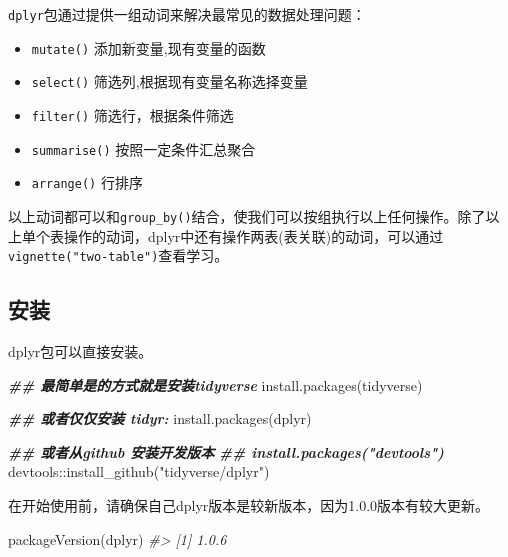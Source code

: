 \documentclass[
]{book}
\newenvironment{Shaded}{\begin{snugshade}}{\end{snugshade}}
\newcommand{\CommentTok}[1]{\textcolor[rgb]{0.56,0.35,0.01}{\textit{#1}}}
\newcommand{\DocumentationTok}[1]{\textcolor[rgb]{0.56,0.35,0.01}{\textbf{\textit{#1}}}}
\newcommand{\FunctionTok}[1]{\textcolor[rgb]{0.00,0.00,0.00}{#1}}
\newcommand{\NormalTok}[1]{#1}
\newcommand{\SpecialCharTok}[1]{\textcolor[rgb]{0.00,0.00,0.00}{#1}}
\newcommand{\StringTok}[1]{\textcolor[rgb]{0.31,0.60,0.02}{#1}}
\begin{document}
\texttt{dplyr}包通过提供一组动词来解决最常见的数据处理问题：

\begin{itemize}
\item
  \texttt{mutate()} 添加新变量,现有变量的函数
\item
  \texttt{select()} 筛选列,根据现有变量名称选择变量
\item
  \texttt{filter()} 筛选行，根据条件筛选
\item
  \texttt{summarise()} 按照一定条件汇总聚合
\item
  \texttt{arrange()} 行排序
\end{itemize}

以上动词都可以和\texttt{group\_by()}结合，使我们可以按组执行以上任何操作。除了以上单个表操作的动词，dplyr中还有操作两表(表关联)的动词，可以通过\texttt{vignette("two-table")}查看学习。

\hypertarget{dplyr:install-package}{%
\subsection{安装}\label{dplyr:install-package}}

dplyr包可以直接安装。

\begin{Shaded}
\begin{Highlighting}[]
\DocumentationTok{\#\# 最简单是的方式就是安装tidyverse}
\FunctionTok{install.packages}\NormalTok{(}\StringTok{\textquotesingle{}tidyverse\textquotesingle{}}\NormalTok{)}

\DocumentationTok{\#\# 或者仅仅安装 tidyr:}
\FunctionTok{install.packages}\NormalTok{(}\StringTok{\textquotesingle{}dplyr\textquotesingle{}}\NormalTok{)}

\DocumentationTok{\#\# 或者从github 安装开发版本}
\DocumentationTok{\#\# install.packages("devtools")}
\NormalTok{devtools}\SpecialCharTok{::}\FunctionTok{install\_github}\NormalTok{(}\StringTok{"tidyverse/dplyr"}\NormalTok{)}
\end{Highlighting}
\end{Shaded}

在开始使用前，请确保自己dplyr版本是较新版本，因为1.0.0版本有较大更新。

\begin{Shaded}
\begin{Highlighting}[]
\FunctionTok{packageVersion}\NormalTok{(}\StringTok{\textquotesingle{}dplyr\textquotesingle{}}\NormalTok{)}
\CommentTok{\#\textgreater{} [1] \textquotesingle{}1.0.6\textquotesingle{}}
\end{Highlighting}
\end{Shaded}
\end{document}
